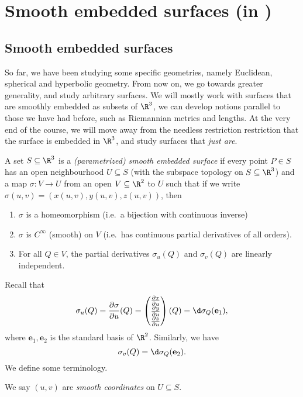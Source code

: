 \documentclass[a4paper]{article}
\begin{document}
\section{Smooth embedded surfaces (in )}
\subsection{Smooth embedded surfaces}
So far, we have been studying some specific geometries, namely Euclidean, spherical and hyperbolic geometry. From now on, we go towards greater generality, and study arbitrary surfaces. We will mostly work with surfaces that are smoothly embedded as subsets of $\R^3$, we can develop notions parallel to those we have had before, such as Riemannian metrics and lengths. At the very end of the course, we will move away from the needless restriction restriction that the surface is embedded in $\R^3$, and study surfaces that \emph{just are}.

\begin{defi}
  A set $S \subseteq \R^3$ is a \emph{(parametrized) smooth embedded surface}
  if every point $P \in S$ has an open neighbourhood $U \subseteq S$ (with the
  subspace   topology on $S \subseteq \R^3$) and a map $\sigma: V \to U$ from an
  open $V \subseteq \R^2$ to $U$ such that if we write
  $\sigma(u, v) = (x(u, v), y(u, v), z(u, v))$, then
  \begin{enumerate}
    \item $\sigma$ is a homeomorphism (i.e.\ a bijection with continuous
      inverse)
    \item $\sigma$ is $C^\infty$ (smooth) on $V$ (i.e.\ has continuous partial
      derivatives of all orders).
    \item For all $Q \in V$, the partial derivatives $\sigma_u(Q)$ and
      $\sigma_v(Q)$ are linearly independent.
  \end{enumerate}
\end{defi}
Recall that
\[
  \sigma_u(Q) = \frac{\partial \sigma}{\partial u}(Q) =
  \begin{pmatrix}
    \frac{\partial x}{\partial u}\\
    \frac{\partial y}{\partial u}\\
    \frac{\partial z}{\partial u}
  \end{pmatrix}
  (Q)
  = \d\sigma_Q (\mathbf{e}_1),
\]
where $\mathbf{e}_1, \mathbf{e}_2$ is the standard basis of $\R^2$. Similarly,
we have
\[
  \sigma_v(Q) = \d \sigma_Q(\mathbf{e}_2).
\]
We define some terminology.
\begin{defi}
  We say $(u, v)$ are \emph{smooth coordinates} on $U \subseteq S$.
\end{defi}
\end{document}
